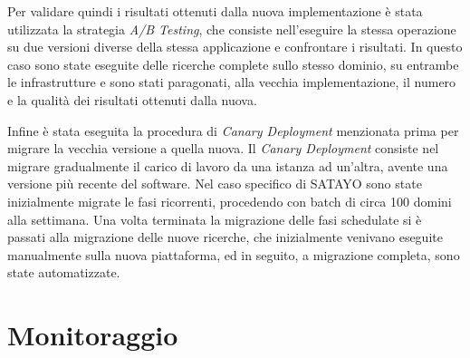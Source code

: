 Per validare quindi i risultati ottenuti dalla nuova implementazione è stata utilizzata
la strategia \textit{A/B Testing}, che consiste nell'eseguire la stessa operazione
su due versioni diverse della stessa applicazione e confrontare i risultati. In
questo caso sono state eseguite delle ricerche complete sullo stesso dominio, su
entrambe le infrastrutture e sono stati paragonati, alla vecchia implementazione,
il numero e la qualità dei risultati ottenuti dalla nuova.

Infine è stata eseguita la procedura di \textit{Canary Deployment} menzionata
prima per migrare la vecchia versione a quella nuova. Il \textit{Canary
Deployment} consiste nel migrare gradualmente il carico di lavoro da una istanza
ad un'altra, avente una versione più recente del software. Nel caso specifico di
SATAYO sono state inizialmente migrate le fasi ricorrenti, procedendo con batch di
circa 100 domini alla settimana. Una volta terminata la migrazione delle fasi
schedulate si è passati alla migrazione delle nuove ricerche, che inizialmente venivano
eseguite manualmente sulla nuova piattaforma, ed in seguito, a migrazione completa,
sono state automatizzate.

\section{Monitoraggio}
\label{sec:monitoraggio}

